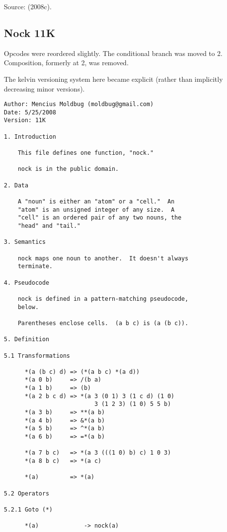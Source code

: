 \documentclass[twoside]{article}
\begin{document}
Source:   (2008c). %

\subsection{Nock 11K}

Opcodes were reordered slightly.  The conditional branch was moved to 2.  Composition, formerly at 2, was removed.

The kelvin versioning system here became explicit (rather than implicitly decreasing minor versions).

\begin{lstlisting}[label=lst:nock11k,caption={Nock 11K, 25 May 2008.},style=listingcode]
Author: Mencius Moldbug (moldbug@gmail.com)
Date: 5/25/2008
Version: 11K

1. Introduction

    This file defines one function, "nock."

    nock is in the public domain.

2. Data

    A "noun" is either an "atom" or a "cell."  An
    "atom" is an unsigned integer of any size.  A
    "cell" is an ordered pair of any two nouns, the
    "head" and "tail."

3. Semantics

    nock maps one noun to another.  It doesn't always
    terminate.

4. Pseudocode

    nock is defined in a pattern-matching pseudocode,
    below.

    Parentheses enclose cells.  (a b c) is (a (b c)).

5. Definition

5.1 Transformations

      *(a (b c) d) => (*(a b c) *(a d))
      *(a 0 b)     => /(b a)
      *(a 1 b)     => (b)
      *(a 2 b c d) => *(a 3 (0 1) 3 (1 c d) (1 0)
                          3 (1 2 3) (1 0) 5 5 b)
      *(a 3 b)     => **(a b)
      *(a 4 b)     => &*(a b)
      *(a 5 b)     => ^*(a b)
      *(a 6 b)     => =*(a b)

      *(a 7 b c)   => *(a 3 (((1 0) b) c) 1 0 3)
      *(a 8 b c)   => *(a c)

      *(a)         => *(a)

5.2 Operators

5.2.1 Goto (*)

      *(a)             -> nock(a)


\end{lstlisting}
\end{document}
